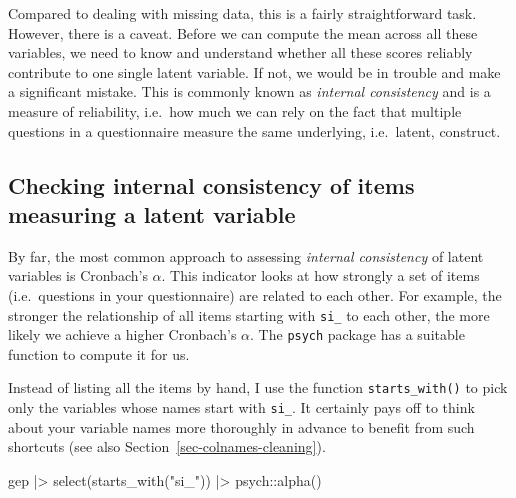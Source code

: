 \documentclass[
  letterpaper,
  DIV=11,
  numbers=noendperiod]{scrreprt}
\newenvironment{Shaded}{\begin{snugshade}}{\end{snugshade}}
\newcommand{\FunctionTok}[1]{\textcolor[rgb]{0.28,0.35,0.67}{#1}}
\newcommand{\NormalTok}[1]{\textcolor[rgb]{0.00,0.23,0.31}{#1}}
\newcommand{\SpecialCharTok}[1]{\textcolor[rgb]{0.37,0.37,0.37}{#1}}
\newcommand{\StringTok}[1]{\textcolor[rgb]{0.13,0.47,0.30}{#1}}
\begin{document}
Compared to dealing with missing data, this is a fairly straightforward
task. However, there is a caveat. Before we can compute the mean across
all these variables, we need to know and understand whether all these
scores reliably contribute to one single latent variable. If not, we
would be in trouble and make a significant mistake. This is commonly
known as \emph{internal consistency} and is a measure of reliability,
i.e.~how much we can rely on the fact that multiple questions in a
questionnaire measure the same underlying, i.e.~latent, construct.

\subsection{Checking internal consistency of items measuring a latent
variable}\label{sec-internal-consistency}

By far, the most common approach to assessing \emph{internal
consistency} of latent variables is Cronbach's \(\alpha\). This
indicator looks at how strongly a set of items (i.e.~questions in your
questionnaire) are related to each other. For example, the stronger the
relationship of all items starting with \texttt{si\_} to each other, the
more likely we achieve a higher Cronbach's \(\alpha\). The
\texttt{psych} package has a suitable function to compute it for us.

Instead of listing all the items by hand, I use the function
\texttt{starts\_with()} to pick only the variables whose names start
with \texttt{si\_}. It certainly pays off to think about your variable
names more thoroughly in advance to benefit from such shortcuts (see
also Section~\ref{sec-colnames-cleaning}).

\begin{Shaded}
\begin{Highlighting}[]
\NormalTok{gep }\SpecialCharTok{|\textgreater{}}
  \FunctionTok{select}\NormalTok{(}\FunctionTok{starts\_with}\NormalTok{(}\StringTok{"si\_"}\NormalTok{)) }\SpecialCharTok{|\textgreater{}}
\NormalTok{  psych}\SpecialCharTok{::}\FunctionTok{alpha}\NormalTok{()}
\end{Highlighting}
\end{Shaded}
\end{document}
